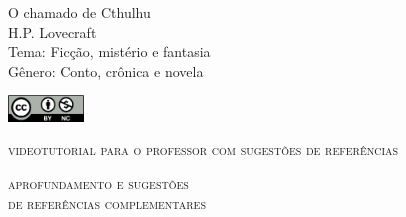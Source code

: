 \documentclass[smaller,professionalfonts,15pt]{beamer}
\begin{document}
										\begin{frame}
										\begin{raggedleft}
										\Huge 
O chamado de Cthulhu					\\
										\huge 
H.P. Lovecraft							\\
										\bigskip
										\normalsize
Tema: Ficção, mistério e fantasia		\\	
Gênero: Conto, crônica e novela			\\\vfill\hfill
\publishername
										\end{raggedleft}

\smallskip\includegraphics[width=2cm]{ccbync.png}\hfill
\end{frame}


\begin{frame}{\textsc{videotutorial para o professor com sugestões de referências}}
\vspace{-2cm}\begin{figure}
\end{figure}
\end{frame}



\begin{frame}
\hfill\Huge
\textsc{aprofundamento e sugestões\\\hfill de referências complementares}
\end{frame}
\end{document}
